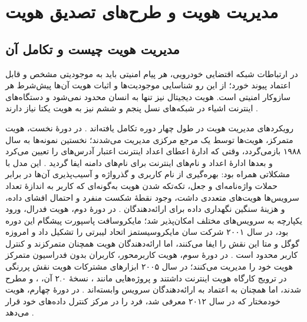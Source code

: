 \section{مدیریت هویت و طرح‌های تصدیق هویت}

\subsection{مدیریت هویت چیست و تکامل آن}

در ارتباطات شبکه اقتضایی خودرویی، هر پیام امنیتی باید به موجودیتی مشخص و قابل اعتماد پیوند خورد؛ از این رو شناسایی موجودیت‌ها و اثبات هویت آن‌ها پیش‌شرط هر سازوکار امنیتی است. هویت دیجیتال نیز تنها به انسان محدود نمی‌شود و دستگاه‌های اینترنت اشیاء در شبکه‌های نسل پنجم و ششم نیز به هویت یکتا نیاز دارند \cite{mazzocca2025survey}.

رویکردهای مدیریت هویت در طول چهار دوره تکامل یافته‌اند \cite{mazzocca2025survey}. در دورهٔ نخست، هویت متمرکز، هویت‌ها توسط یک مرجع مرکزی مدیریت می‌شدند؛ نخستین نمونه‌ها به سال ۱۹۸۸ بازمی‌گردد، وقتی که ادارهٔ اعطای اعداد اینترنت  اعتبار آدرس‌های  را تعیین می‌کرد و بعدها ادارهٔ اعداد و نام‌های اینترنت  برای نام‌های دامنه ایفا گردید \cite{mazzocca2025survey}. این مدل با مشکلاتی همراه بود: بهره‌گیری از نام کاربری و گذرواژه و آسیب‌پذیری آن‌ها در برابر حملات واژه‌نامه‌ای و جعل، تکه‌تکه شدن هویت به‌گونه‌ای که کاربر به اندازهٔ تعداد سرویس‌ها هویت‌های متعددی داشت، وجود نقطهٔ شکست منفرد و احتمال افشای داده، و هزینهٔ سنگین نگهداری داده برای ارائه‌دهندگان \cite{mazzocca2025survey}. در دورهٔ دوم، هویت فدرال، ورود یکپارچه به سرویس‌های مختلف  امکان‌پذیر شد؛ مایکروسافت پاسپورت پیشگام این دوره بود، در سال ۲۰۰۱ شرکت سان مایکروسیستمز اتحاد لیبرتی  را تشکیل داد و امروزه گوگل و متا این نقش را ایفا می‌کنند، اما ارائه‌دهندگان هویت همچنان متمرکزند و کنترل کاربر محدود است \cite{mazzocca2025survey}. در دورهٔ سوم، هویت کاربرمحور، کاربران بدون فدراسیون متمرکز هویت خود را مدیریت می‌کنند؛ در سال ۲۰۰۵ ابزارهای مشترکات هویت  نقش پررنگی در ترویج کارگاه هویت اینترنت  داشتند و پروژه‌هایی مانند ، نسخهٔ ۲.۰ آن، ،  و  مطرح شدند، اما همچنان به اعتماد به ارائه‌دهندگان سرویس وابسته‌اند \cite{mazzocca2025survey}. در دورهٔ چهارم، هویت خودمختار که در سال ۲۰۱۲ معرفی شد، فرد را در مرکز کنترل داده‌های خود قرار می‌دهد \cite{mazzocca2025survey}.


